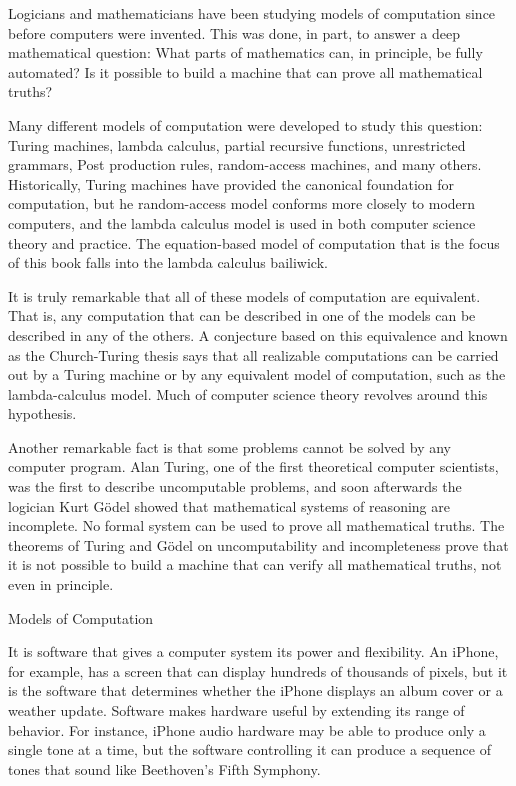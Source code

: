 \begin{aside}
Logicians and mathematicians have been studying models of computation
since before computers were invented. This was done, in part, to
answer a deep mathematical question: What parts of mathematics can,
in principle, be fully automated?  Is it possible to
build a machine that can prove all mathematical truths?

Many different models of computation were developed to study this question:
Turing machines, lambda calculus, partial recursive functions,
unrestricted grammars, Post production rules, random-access machines,
and many others.
Historically, Turing machines have provided the canonical foundation for computation,
but he random-access model conforms more closely to modern computers,
and the lambda calculus model is used in both computer science theory and practice.
The equation-based model of computation that is the focus of this book
falls into the lambda calculus bailiwick.

It is truly remarkable that all of these models of
computation are equivalent.  That is,
any computation that can be described in one of the models can
be described in any of the others.
A conjecture based on this equivalence
and known as the Church-Turing thesis
says that all realizable computations can
be carried out by a Turing machine or by
any equivalent model of computation, such as
the lambda-calculus model.
Much of computer science theory
revolves around this hypothesis.

Another remarkable fact is that some problems cannot be solved 
by any computer program.
Alan Turing, one of the first theoretical computer scientists,
was the first to describe uncomputable problems,
and soon afterwards the logician Kurt G\"odel
showed that mathematical systems of reasoning
are incomplete. No formal system can be used
to prove all mathematical truths.
The theorems of Turing and G\"odel on uncomputability and incompleteness
prove that it is not possible to build a machine that can verify all mathematical
truths, not even in principle.

\caption{Models of Computation}
\label{aside-model-of-computation}
\end{aside}

It is software that gives a computer system its power and flexibility.
An iPhone, for example, has a screen that
can display hundreds of thousands of pixels,
but it is the software that determines whether the
iPhone displays an album cover or a weather update.
Software makes hardware useful by extending its range of behavior.
For instance, iPhone audio hardware may be able to produce
only a single tone at a time, but the software controlling it
can produce a sequence of tones
that sound like Beethoven's Fifth Symphony.

